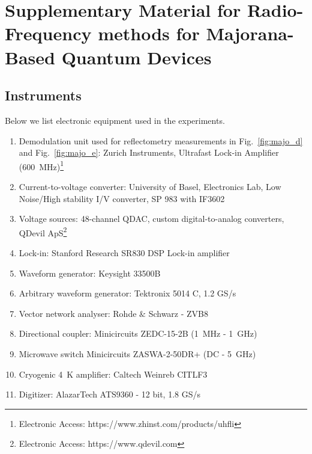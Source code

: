 \chapter{Supplementary Material for Radio-Frequency methods for Majorana-Based Quantum Devices}

\section{Instruments}
\label{sec:majo_B}

Below we list electronic equipment used in the experiments.

\begin{enumerate}
\item Demodulation unit used for reflectometry measurements in Fig.~\ref{fig:majo_d} and Fig.~\ref{fig:majo_e}: Zurich Instruments, Ultrafast Lock-in Amplifier (\SI{600}{\mega\hertz})\footnote{Electronic Access: https://www.zhinst.com/products/uhfli}

\item Current-to-voltage converter: University of Basel, Electronics Lab, Low Noise/High stability I/V converter, SP 983 with IF3602

\item Voltage sources: 48-channel QDAC, custom digital-to-analog converters, QDevil ApS\footnote{Electronic Access: https://www.qdevil.com}

\item Lock-in: Stanford Research SR830 DSP Lock-in amplifier

\item Waveform generator: Keysight 33500B

\item Arbitrary waveform generator: Tektronix 5014 C, 1.2 GS/s

\item Vector network analyser: Rohde $\&$ Schwarz - ZVB8

\item Directional coupler: Minicircuits ZEDC-15-2B (\SI{1}{\mega\hertz} - \SI{1}{\giga\hertz})

\item Microwave switch Minicircuits ZASWA-2-50DR+ (DC - \SI{5}{\giga\hertz})

\item Cryogenic \SI{4}{\kelvin} amplifier: Caltech Weinreb CITLF3

\item Digitizer: AlazarTech ATS9360 - 12 bit, 1.8 GS/s
\end{enumerate}

